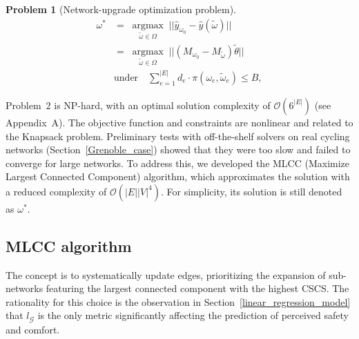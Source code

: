\documentclass[lettersize,journal]{IEEEtran}
\newtheorem{problem}{Problem}
\begin{document}
\begin{problem}[Network-upgrade optimization problem]
    \begin{align}
        \label{problem_a_1}
        \omega^{\ast} &= \; \underset{\tilde{\omega} \in \Omega}{\operatorname{argmax}} \; ||\hat{y}_{\omega_{0}}- \hat{y}(\tilde{\omega}) || \\
        &= \label{problem_a_2} \; \underset{\tilde{\omega} \in \Omega}{\operatorname{argmax}} \; ||(M_{\omega_{0}}- M_{\tilde{\omega}}) \tilde{\theta} || \\
        & \label{problem_a_3} \text{under} \quad   \sum_{e=1}^{|E|} d_{e} \cdot \pi(\omega_{e},\tilde{\omega}_{e}) \leq B,
    \end{align}
\end{problem}
%
Problem~$2$ is NP-hard, with an optimal solution complexity of $\mathcal{O}(6^{|E|})$ (see Appendix~A). The objective function and constraints are nonlinear and related to the Knapsack problem. Preliminary tests with off-the-shelf solvers on real cycling networks (Section~\ref{Grenoble_case}) showed that they were too slow and failed to converge for large networks. To address this, we developed the MLCC (Maximize Largest Connected Component) algorithm, which approximates the solution with a reduced complexity of $\mathcal{O}(|E||V|^{4})$. For simplicity, its solution is still denoted as $\omega^{\ast}$.





\subsection{MLCC algorithm} 
\label{section:mlcc}

The concept is to systematically update edges, prioritizing the expansion of sub-networks featuring the largest connected component with the highest CSCS. The rationality for this choice is the observation in Section~\ref{linear_regression_model} that $l_{\mathcal{G}}$ is the only metric significantly affecting the prediction of perceived safety and comfort.
\end{document}
